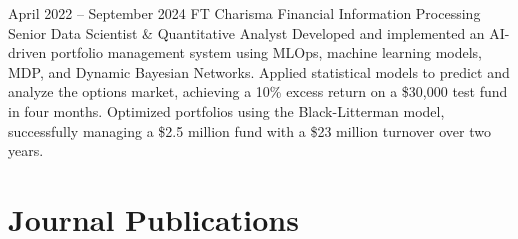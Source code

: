 \documentclass[
	10pt, %
]{FreemanCV}
\begin{document}
\begin{paracol}{2}

\jobentry
	{April 2022  -- September 2024} %
	{FT} %
	{Charisma Financial Information Processing} %
	{Senior Data Scientist \& Quantitative Analyst} %
	{Developed and implemented an AI-driven portfolio management system using MLOps, machine learning models, MDP, and Dynamic Bayesian Networks. Applied statistical models to predict and analyze the options market, achieving a 10\% excess return on a \$30,000 test fund in four months. Optimized portfolios using the Black-Litterman model, successfully managing a \$2.5 million fund with a \$23 million turnover over two years.} %

%
%







\section{Journal Publications}


\end{paracol}
\end{document}

